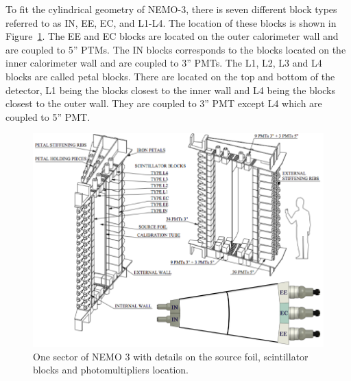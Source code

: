 \documentclass[main.tex]{subfiles}
\begin{document}
\bigskip




\bigskip


\NI To fit the cylindrical geometry of NEMO-3, there is seven different block types referred to as IN, EE, EC, and L1-L4. The location of these blocks is shown in Figure~\ref{SectorDetailedPMTconfig}. The EE and EC blocks are located on the outer calorimeter wall and are coupled to 5'' PTMs. The IN blocks corresponds to the blocks located on the inner calorimeter wall and are coupled to 3'' PMTs. The L1, L2, L3 and L4 blocks are called petal blocks. There are located on the top and bottom of the detector, L1 being the blocks closest to the inner wall and L4 being the blocks closest to the outer wall. They are coupled to 3'' PMT except L4 which are coupled to 5'' PMT.  


\begin{figure}[h!]
\begin{center}
\includegraphics[scale=0.34]{pictures/Chap3/SectorDetailedPMTconfig.png}
\caption{One sector of NEMO 3 with details on the source foil, scintillator blocks and photomultipliers location.}
\label{SectorDetailedPMTconfig}
\end{center}
\end{figure}
\end{document}
